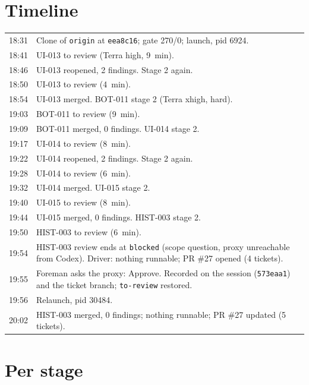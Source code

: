 \documentclass[11pt,a4paper]{article}
\begin{document}
\section*{Timeline}

\begin{tabularx}{\linewidth}{@{}lX@{}}
\toprule
18:31 & Clone of \texttt{origin} at \texttt{eea8c16}; gate 270/0; launch, pid 6924. \\
18:41 & UI-013 to review (Terra high, 9~min). \\
18:46 & UI-013 reopened, 2 findings. Stage 2 again. \\
18:50 & UI-013 to review (4~min). \\
18:54 & UI-013 merged. BOT-011 stage 2 (Terra xhigh, hard). \\
19:03 & BOT-011 to review (9~min). \\
19:09 & BOT-011 merged, 0 findings. UI-014 stage 2. \\
19:17 & UI-014 to review (8~min). \\
19:22 & UI-014 reopened, 2 findings. Stage 2 again. \\
19:28 & UI-014 to review (6~min). \\
19:32 & UI-014 merged. UI-015 stage 2. \\
19:40 & UI-015 to review (8~min). \\
19:44 & UI-015 merged, 0 findings. HIST-003 stage 2. \\
19:50 & HIST-003 to review (6~min). \\
19:54 & HIST-003 review ends at \texttt{blocked} (scope question, proxy unreachable from Codex). Driver: nothing runnable; PR \#27 opened (4 tickets). \\
19:55 & Foreman asks the proxy: Approve. Recorded on the session (\texttt{573eaa1}) and the ticket branch; \texttt{to-review} restored. \\
19:56 & Relaunch, pid 30484. \\
20:02 & HIST-003 merged, 0 findings; nothing runnable; PR \#27 updated (5 tickets). \\
\bottomrule
\end{tabularx}

\section*{Per stage}
\end{document}
